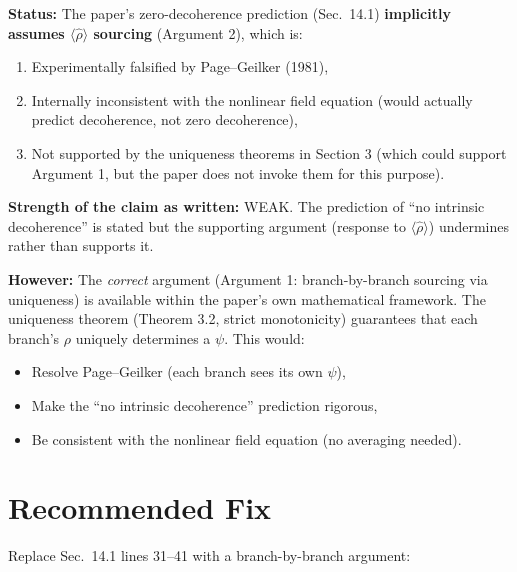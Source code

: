 \documentclass[11pt,a4paper]{article}
\begin{document}
\begin{tcolorbox}[colback=red!5!white, colframe=red!70!black,
  title=\textbf{INCONSISTENCY IDENTIFIED}]

\textbf{Status:} The paper's zero-decoherence prediction (Sec.~14.1)
\textbf{implicitly assumes $\langle\hat\rho\rangle$ sourcing}
(Argument 2), which is:
\begin{enumerate}
\item Experimentally falsified by Page--Geilker (1981),
\item Internally inconsistent with the nonlinear field equation
(would actually predict decoherence, not zero decoherence),
\item Not supported by the uniqueness theorems in Section 3
(which could support Argument 1, but the paper does not invoke them
for this purpose).
\end{enumerate}

\textbf{Strength of the claim as written:} WEAK. The prediction of
``no intrinsic decoherence'' is stated but the supporting argument
(response to $\langle\hat\rho\rangle$) undermines rather than
supports it.

\textbf{However:} The \emph{correct} argument (Argument 1:
branch-by-branch sourcing via uniqueness) is available within the
paper's own mathematical framework. The uniqueness theorem
(Theorem 3.2, strict monotonicity) guarantees that each branch's
$\rho$ uniquely determines a $\psi$. This would:
\begin{itemize}
\item Resolve Page--Geilker (each branch sees its own $\psi$),
\item Make the ``no intrinsic decoherence'' prediction rigorous,
\item Be consistent with the nonlinear field equation (no averaging
needed).
\end{itemize}
\end{tcolorbox}

\section{Recommended Fix}

Replace Sec.~14.1 lines 31--41 with a branch-by-branch argument:
\end{document}
